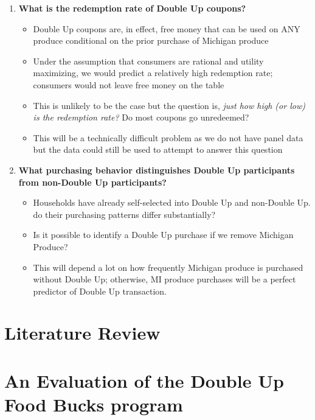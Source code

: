 \documentclass[11pt,letterpaperpaper,]{book}
\providecommand{\tightlist}{%
  \setlength{\itemsep}{0pt}\setlength{\parskip}{0pt}}
\begin{document}
\begin{enumerate}
\def\labelenumi{\arabic{enumi}.}
\tightlist
\item
  \textbf{What is the redemption rate of Double Up coupons?}

  \begin{itemize}
  \tightlist
  \item
    Double Up coupons are, in effect, free money that can be used on ANY
    produce conditional on the prior purchase of Michigan produce
  \item
    Under the assumption that consumers are rational and utility
    maximizing, we would predict a relatively high redemption rate;
    consumers would not leave free money on the table
  \item
    This is unlikely to be the case but the question is, \emph{just how
    high (or low) is the redemption rate?} Do most coupons go
    unredeemed?
  \item
    This will be a technically difficult problem as we do not have panel
    data but the data could still be used to attempt to answer this
    question
  \end{itemize}
\item
  \textbf{What purchasing behavior distinguishes Double Up participants
  from non-Double Up participants?}

  \begin{itemize}
  \tightlist
  \item
    Households have already self-selected into Double Up and non-Double
    Up. do their purchasing patterns differ substantially?
  \item
    Is it possible to identify a Double Up purchase if we remove
    Michigan Produce?
  \item
    This will depend a lot on how frequently Michigan produce is
    purchased without Double Up; otherwise, MI produce purchases will be
    a perfect predictor of Double Up transaction.
  \end{itemize}
\end{enumerate}

\chapter*{Literature Review}\label{literature-review}

\chapter{An Evaluation of the Double Up Food Bucks
program}\label{an-evaluation-of-the-double-up-food-bucks-program}
\end{document}
